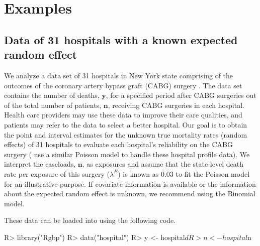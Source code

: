 \documentclass[article]{jss}
\begin{document}


\section[Examples]{Examples}\label{sec6}
\subsection[Known Second-level Mean]{Data of 31 hospitals with a known expected random effect}
\label{sec:ex:hosp}


We analyze a data set of 31 hospitals in New York state comprising of the outcomes of the coronary artery bypass graft (CABG) surgery \citep{morris2012}. The data set contains the number of deaths, $\boldsymbol{y}$, for a specified period after CABG surgeries out of the total number of patients, $\boldsymbol{n}$, receiving CABG surgeries in each hospital. Health care providers may use these data to improve their care qualities, and patients may refer to the data to select a better hospital. Our goal is to obtain the point and interval estimates for the unknown true mortality rates (random effects) of 31 hospitals to evaluate  each hospital's reliability on the CABG surgery (\cite{morris1995} use a similar Poisson model to handle these hospital profile data). We interpret the caseloads, $\boldsymbol{n}$,  as exposures and assume that the state-level death rate per exposure of this surgery ($\lambda^E$) is known as 0.03 to fit the Poisson model for an illustrative purpose.  If covariate information is available or the information about the expected random effect is unknown, we recommend using the Binomial model.

These data can be loaded into  using the following code.
\begin{CodeChunk}
\begin{CodeInput}
R> library("Rgbp")
R> data("hospital")
R> y <- hospital$d
R> n <- hospital$n
\end{CodeInput}
\end{CodeChunk}
\end{document}
